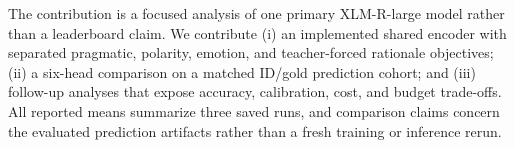 The contribution is a focused analysis of one primary XLM-R-large model rather than a leaderboard claim. We contribute (i) an implemented shared encoder with separated pragmatic, polarity, emotion, and teacher-forced rationale objectives; (ii) a six-head comparison on a matched ID/gold prediction cohort; and (iii) follow-up analyses that expose accuracy, calibration, cost, and budget trade-offs. All reported means summarize three saved runs, and comparison claims concern the evaluated prediction artifacts rather than a fresh training or inference rerun.
